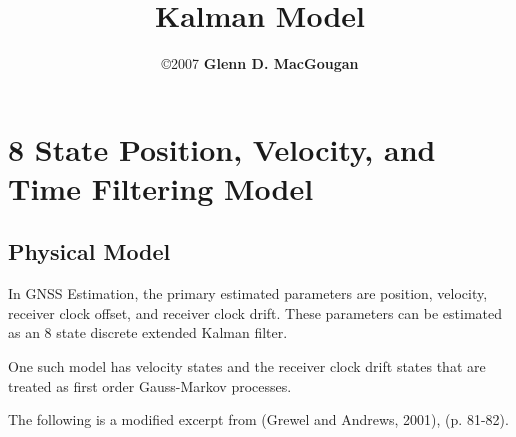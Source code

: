 \documentclass[11pt,letterpaper]{article}
\begin{document}
\title{\Huge {Kalman Model}}
\author{\copyright 2007 \textbf{Glenn D. MacGougan}}
\date{}

\maketitle

\pagebreak

\section{8 State Position, Velocity, and Time Filtering Model}

\subsection{Physical Model}

In GNSS Estimation, the primary estimated parameters are position, velocity, receiver clock offset, and receiver clock drift. These parameters can be estimated
as an 8 state discrete extended Kalman filter.

One such model has velocity states and the receiver clock drift states that are treated as first order Gauss-Markov processes.

The following is a modified excerpt from (Grewel and Andrews, 2001), (p. 81-82).
\end{document}
